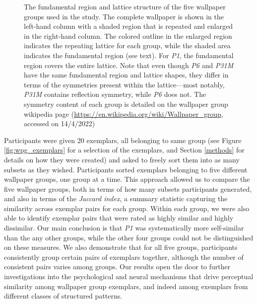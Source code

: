 \documentclass[symmetry,article,accept,pdftex,moreauthors]{Definitions/mdpi}
\begin{document}
\begin{figure}[H]
	\caption{The fundamental region and lattice structure of the five wallpaper groups used in the study. The complete wallpaper is shown in the left-hand column with a shaded region that is repeated and enlarged in the right-hand column. The colored outline in the enlarged region indicates the repeating lattice for each group, while the shaded area indicates the fundamental region (see text). For \textit{P1}, the fundamental region covers the entire lattice. Note that even though \textit{P6} and \textit{P31M} have the same fundamental region and lattice shapes, they differ in terms of the symmetries present within the lattice---most notably, \textit{P31M} contains reflection symmetry, while \textit{P6} does not. The symmetry content of each group is detailed on the wallpaper group wikipedia page (\url{https://en.wikipedia.org/wiki/Wallpaper_group}, accessed on 14/4/2022)}
	\label{fig:wpg_structure}
\end{figure}

Participants were given 20 exemplars, all belonging to same group (see Figure \ref{fig:wpg_exemplars} for a selection of the exemplars, and Section \ref{methods} for details on how they were created) and asked to freely sort them into as many subsets as they wished. Participants sorted exemplars belonging to five different wallpaper groups, one group at a time. This approach allowed us to compare the five wallpaper groups, both in terms of how many subsets participants generated, and also in terms of the \textit{Jaccard index}, a summary statistic capturing the similarity across exemplar pairs for each group. Within each group, we were also able to identify exemplar pairs that were rated as highly similar and highly dissimilar. Our main conclusion is that \textit{P1} was systematically more self-similar than the any other groups, while the other four groups could not be distinguished on these measures. We also demonstrate that for all five groups, participants consistently group certain pairs of exemplars together, although the number of consistent pairs varies among groups. Our results open the door to further investigations into the psychological and neural mechanisms that drive perceptual similarity among wallpaper group exemplars, and indeed among exemplars from different classes of structured patterns. 
\end{document}
